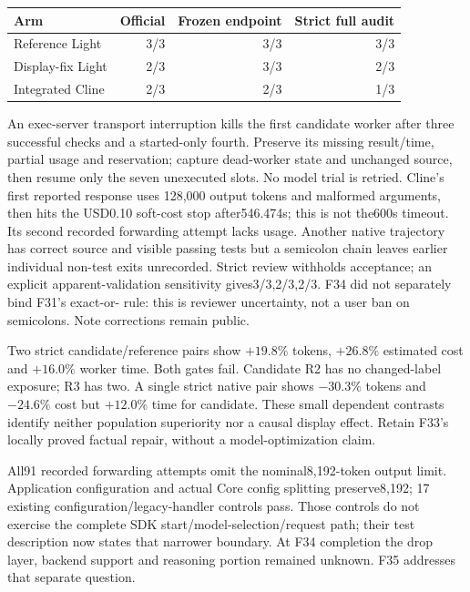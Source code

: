 \documentclass[11pt,a4paper]{article}
\newcommand{\code}[1]{\texttt{\detokenize{#1}}}
\begin{document}
\begin{center}
\begin{tabular}{lrrr}
\toprule Arm & Official & Frozen endpoint & Strict full audit \\\midrule
Reference Light & 3/3 & 3/3 & 3/3 \\
Display-fix Light & 2/3 & 3/3 & 2/3 \\
Integrated Cline & 2/3 & 2/3 & 1/3 \\\bottomrule
\end{tabular}
\end{center}
An exec-server transport interruption kills the first candidate worker after three
successful checks and a started-only fourth. Preserve its missing result/time,
partial usage and reservation; capture dead-worker state and unchanged source,
then resume only the seven unexecuted slots. No model trial is retried.
Cline's first reported response uses 128,000 output tokens and malformed
\code{parallel} arguments, then hits the USD0.10 soft-cost stop after546.474s;
this is not the600s timeout. Its second recorded forwarding attempt lacks usage.
Another native trajectory has correct source and visible passing tests but a
semicolon chain leaves earlier individual non-test exits unrecorded. Strict review
withholds acceptance; an explicit apparent-validation sensitivity gives3/3,2/3,2/3.
F34 did not separately bind F31's exact-or-\code{&&} rule: this is reviewer
uncertainty, not a user ban on semicolons. Note corrections remain public.

Two strict candidate/reference pairs show $+19.8\%$ tokens, $+26.8\%$ estimated
cost and $+16.0\%$ worker time. Both gates fail. Candidate R2 has no changed-label
exposure; R3 has two. A single strict native pair shows $-30.3\%$ tokens and
$-24.6\%$ cost but $+12.0\%$ time for candidate. These small dependent contrasts
identify neither population superiority nor a causal display effect. Retain F33's
locally proved factual repair, without a model-optimization claim.

All91 recorded forwarding attempts omit the nominal8,192-token output limit.
Application configuration and actual Core config splitting preserve8,192;
17 existing configuration/legacy-handler controls pass. Those controls do not
exercise the complete SDK start/model-selection/request path; their test description
now states that narrower boundary. At F34 completion the drop layer, backend
support and reasoning portion remained unknown. F35 addresses that separate question.
\end{document}
